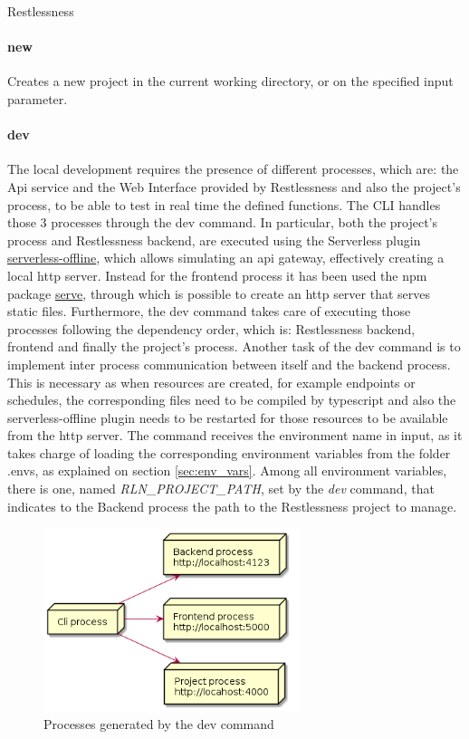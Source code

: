 \begin{chapter}{Restlessness}
    \paragraph{new}
    Creates a new project in the current working directory, or on the specified
    input parameter.

    \paragraph{dev}
    \label{dev_command}
    The local development requires the presence of different processes, which are:
    the Api service and the Web Interface provided by Restlessness and also the
    project's process, to be able to test in real time the defined functions. The
    CLI handles those 3 processes through the dev command. In particular, both the
    project's process and Restlessness backend, are executed using the Serverless plugin
    \href{https://www.npmjs.com/package/serverless-offline}{serverless-offline},
    which allows simulating an api gateway, effectively creating a local http server.
    Instead for the frontend process it has been used the npm package
    \href{https://www.npmjs.com/package/serve}{serve}, through which is possible
    to create an http server that serves static files.
    Furthermore, the dev command takes care of executing those processes following the
    dependency order, which is: Restlessness backend, frontend and finally the
    project's process.
    Another task of the dev command is to implement inter process communication between
    itself and the backend process. This is necessary as when resources are created,
    for example endpoints or schedules, the corresponding files need to be compiled by
    typescript and also the serverless-offline plugin needs to be restarted for those
    resources to be available from the http server.
    The command receives the environment name in input, as it takes charge of loading
    the corresponding environment variables from the folder .envs, as explained on
    section \ref{sec:env_vars}. Among all environment variables, there is one, named
    \mbox{\textit{RLN\_PROJECT\_PATH}}, set by the \textit{dev} command, that indicates
    to the Backend process the path to the Restlessness project to manage.
    \begin{figure}
        \centering
        \includegraphics[width=7.5cm]{source/diagrams/rln_dev_processes.png}
        \caption{Processes generated by the dev command}
    \end{figure}


\end{chapter}
